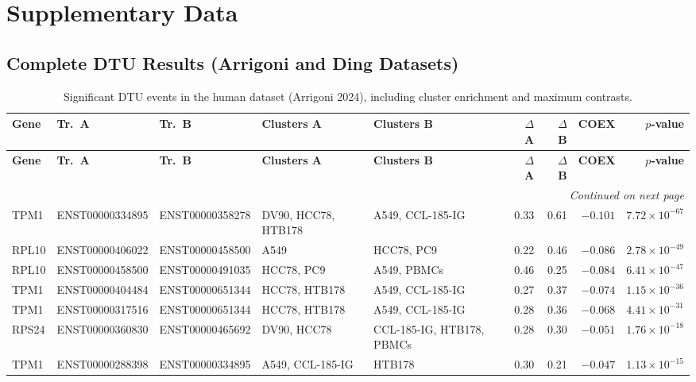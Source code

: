 \chapter{Supplementary Data}
\section{Complete DTU Results (Arrigoni and Ding Datasets)}

\begin{landscape}
\begingroup
\footnotesize
\setlength{\tabcolsep}{4.5pt}
\begin{longtable}{@{} l l l >{\raggedright\arraybackslash}p{3.4cm} >{\raggedright\arraybackslash}p{3.4cm} r r r r @{}}
\caption{Significant DTU events in the human dataset (Arrigoni 2024), including cluster enrichment and maximum contrasts.\label{tab:arrigoni_landscape}}\\
\toprule
\textbf{Gene} & \textbf{Tr.~A} & \textbf{Tr.~B} & \textbf{Clusters A} & \textbf{Clusters B} & \textbf{$\Delta$ A} & \textbf{$\Delta$ B} & \textbf{COEX} & \textbf{$p$-value} \\
\midrule
\endfirsthead
\toprule
\textbf{Gene} & \textbf{Tr.~A} & \textbf{Tr.~B} & \textbf{Clusters A} & \textbf{Clusters B} & \textbf{$\Delta$ A} & \textbf{$\Delta$ B} & \textbf{COEX} & \textbf{$p$-value} \\
\midrule
\endhead
\midrule
\multicolumn{9}{r}{\textit{Continued on next page}} \\
\endfoot
\bottomrule
\endlastfoot
TPM1   & ENST00000334895 & ENST00000358278 & DV90, HCC78, HTB178 & A549, CCL-185-IG & 0.33 & 0.61 & $-0.101$ & $7.72 \times 10^{-67}$ \\
RPL10  & ENST00000406022 & ENST00000458500 & A549 & HCC78, PC9 & 0.22 & 0.46 & $-0.086$ & $2.78 \times 10^{-49}$ \\
RPL10  & ENST00000458500 & ENST00000491035 & HCC78, PC9 & A549, PBMCs & 0.46 & 0.25 & $-0.084$ & $6.41 \times 10^{-47}$ \\
TPM1   & ENST00000404484 & ENST00000651344 & HCC78, HTB178 & A549, CCL-185-IG & 0.27 & 0.37 & $-0.074$ & $1.15 \times 10^{-36}$ \\
TPM1   & ENST00000317516 & ENST00000651344 & HCC78, HTB178 & A549, CCL-185-IG & 0.28 & 0.36 & $-0.068$ & $4.41 \times 10^{-31}$ \\
RPS24  & ENST00000360830 & ENST00000465692 & DV90, HCC78 & CCL-185-IG, HTB178, PBMCs & 0.28 & 0.30 & $-0.051$ & $1.76 \times 10^{-18}$ \\
TPM1   & ENST00000288398 & ENST00000334895 & A549, CCL-185-IG & HTB178 & 0.30 & 0.21 & $-0.047$ & $1.13 \times 10^{-15}$ \\

\end{longtable}
\end{landscape}
